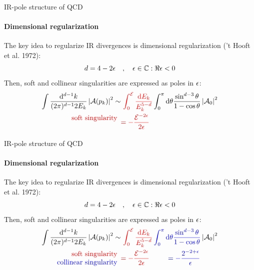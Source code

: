 
\begin{frame}[noframenumbering]{IR-pole structure of QCD}
  \framesubtitle{Dimensional regularization}

  \justifying
  The key idea to regularize IR divergences is dimensional regularization ('t Hooft et al. 1972):
  \begin{equation*}
    d = 4 - 2 \epsilon
    \quad , \quad
    \epsilon \in \mathbb{C} : \Re{\epsilon} < 0
  \end{equation*}
  Then, soft and collinear singularities are expressed as poles in $ \epsilon $:
  \begin{equation*}
    \begin{split}
      \int \frac{\mathrm{d}^{d-1}k}{(2\pi)^{d-1} 2E_k} \left\lvert\mathcal{A}(p_k)\right\rvert^2 \sim
      & \,\, \textcolor{red}{\int_0^{\mathcal{E}} \frac{\mathrm{d} E_k}{E_k^{5-d}}} \int_0^\pi \mathrm{d} \theta \frac{\sin^{d-3} \theta}{1 - \cos \theta} \left\lvert\mathcal{A}_0\right\rvert^2 \\
      \begin{array}{r}
        \textcolor{red}{\text{soft singularity}} \\
        \text{ }
      \end{array}
      & \textcolor{red}{= - \frac{\mathcal{E}^{-2\epsilon}}{2\epsilon}}
    \end{split}
  \end{equation*}

\end{frame}


\begin{frame}[noframenumbering]{IR-pole structure of QCD}
  \framesubtitle{Dimensional regularization}

  \justifying
  The key idea to regularize IR divergences is dimensional regularization ('t Hooft et al. 1972):
  \begin{equation*}
    d = 4 - 2 \epsilon
    \quad , \quad
    \epsilon \in \mathbb{C} : \Re{\epsilon} < 0
  \end{equation*}
  Then, soft and collinear singularities are expressed as poles in $ \epsilon $:
  \begin{equation*}
    \begin{split}
      \int \frac{\dd^{d-1}k}{(2\pi)^{d-1} 2E_k} \abs{\ampl(p_k)}^2 \sim
      & \,\, \textcolor{red}{\int_0^{\ema} \frac{\dd E_k}{E_k^{5-d}}} \, \textcolor{blue}{\int_0^\pi \dd \theta \frac{\sin^{d-3} \theta}{1 - \cos \theta}} \abs{\ampl_0}^2 \\
      \begin{array}{r}
        \textcolor{red}{\text{soft singularity}} \\
        \textcolor{blue}{\text{collinear singularity}}
      \end{array}
      & \textcolor{red}{= - \frac{\ema^{-2\de}}{2\de}} \qquad \,\,\ \textcolor{blue}{= - \frac{2^{-2 + \de}}{\de}}
    \end{split}
  \end{equation*}

\end{frame}

